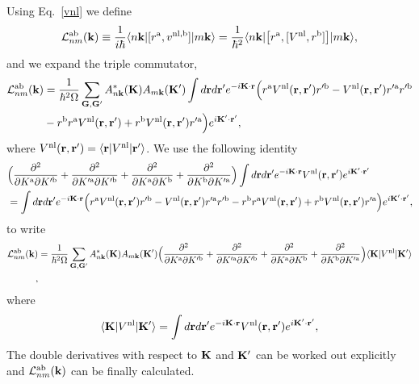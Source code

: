 \documentclass[floatfix,prb,aps,superscriptaddress,11pt,preprint,letterpaper]{revtex4}
\begin{document}
\label{calt}
Using Eq.~\eqref{vnl} we define
\begin{align}\label{3.1}
{\cal L}^{\mathrm{a}\mathrm{b}}_{nm}(\mathbf{k}) 
\equiv\frac{1}{i\hbar}
\langle n\mathbf{k} |
[ r^{\mathrm{a}}, v^{\mathrm{nl},\mathrm{b}}]
| m\mathbf{k} \rangle
=
\frac{1}{\hbar^2}
\langle n\mathbf{k} |
\big[ r^{\mathrm{a}},[ V^{\mathrm{nl}}, r^{\mathrm{b}}]\big]
| m\mathbf{k} \rangle
,
\end{align} 
{\color{red} and we expand the triple commutator,}
\begin{align}\label{3.5}
{\cal L}^{\mathrm{a}\mathrm{b}}_{nm}(\mathbf{k}) 
&=
\frac{1}{\hbar^2\Omega}
\sum_{\mathbf{G},\mathbf{G}'} 
A^*_{n\mathbf{k}}(\mathbf{K}) 
A_{m\mathbf{k}}(\mathbf{K}')
\int
d\mathbf{r} d\mathbf{r}'
 e^{-i\mathbf{K}\cdot\mathbf{r}}
\Big(
r^{\mathrm{a}}
V^{\mathrm{nl}}(\mathbf{r},\mathbf{r}')
r'^{\mathrm{b}}
-
V^{\mathrm{nl}}(\mathbf{r},\mathbf{r}')
r'^{\mathrm{a}}
r'^{\mathrm{b}}
\nonumber\\
&-
r^{\mathrm{b}}
r^{\mathrm{a}}
V^{\mathrm{nl}}(\mathbf{r},\mathbf{r}')
+
 r^{\mathrm{b}}
V^{\mathrm{nl}}(\mathbf{r},\mathbf{r}')
r'^{\mathrm{a}}
\Big) 
 e^{i\mathbf{K}'\cdot\mathbf{r}'}
,
\end{align} 
where 
$V^{\mathrm{nl}}(\mathbf{r},\mathbf{r}') = \langle \mathbf{r} | V^{\mathrm{nl}}| \mathbf{r}' \rangle$.
We use the following identity
\begin{align}\label{3.4}
&
\Big(
\frac{\partial^2}{\partial K^{\mathrm{a}}\partial K'^{\mathrm{b}}}
+
\frac{\partial^2}{\partial K'^{\mathrm{a}}\partial K'^{\mathrm{b}}}
+
\frac{\partial^2}{\partial K^{\mathrm{a}}\partial K^{\mathrm{b}}}
+
\frac{\partial^2}{\partial K^{\mathrm{b}}\partial K'^{\mathrm{a}}}
\Big)
\int 
d\mathbf{r} d\mathbf{r}' 
 e^{-i\mathbf{K}\cdot\mathbf{r}}
V^{\mathrm{nl}}(\mathbf{r},\mathbf{r}') 
e^{i\mathbf{K}'\cdot\mathbf{r}'}
\nonumber\\
&=
\int d\mathbf{r} d\mathbf{r}'
 e^{-i\mathbf{K}\cdot\mathbf{r}}
\Big( 
r^{\mathrm{a}} 
V^{\mathrm{nl}}(\mathbf{r},\mathbf{r}') 
r'^{\mathrm{b}}
- 
V^{\mathrm{nl}}(\mathbf{r},\mathbf{r}') 
r'^{\mathrm{a}} 
r'^{\mathrm{b}}
- 
r^{\mathrm{b}} 
r^{\mathrm{a}} 
V^{\mathrm{nl}}(\mathbf{r},\mathbf{r}')
+
 r^{\mathrm{b}} 
V^{\mathrm{nl}}(\mathbf{r},\mathbf{r}') 
r'^{\mathrm{a}}
\Big)  
e^{i\mathbf{K}'\cdot\mathbf{r}'}
,
\end{align}
to write
\begin{align}\label{3.7}
{\cal L}^{\mathrm{a}\mathrm{b}}_{nm}(\mathbf{k})
&=
\frac{1}{\hbar^2\Omega}
\sum_{\mathbf{G},\mathbf{G}'} 
A^*_{n\mathbf{k}}(\mathbf{K}) 
A_{m\mathbf{k}}(\mathbf{K}')
\Big(
\frac{\partial^2}{\partial K^{\mathrm{a}}\partial K'^{\mathrm{b}}}
+
\frac{\partial^2}{\partial K'^{\mathrm{a}}\partial K'^{\mathrm{b}}}
+
\frac{\partial^2}{\partial K^{\mathrm{a}}\partial K^{\mathrm{b}}}
+
\frac{\partial^2}{\partial K^{\mathrm{b}}\partial K'^{\mathrm{a}}}
\Big)
\langle \mathbf{K} | 
V^{\mathrm{nl}} 
| \mathbf{K}' \rangle 
\nonumber\\
,
\end{align} 
where
\begin{align}\label{vkk}
\langle \mathbf{K} | 
V^{\mathrm{nl}} 
| \mathbf{K}' \rangle 
=
\int 
d\mathbf{r} d\mathbf{r}' 
 e^{-i\mathbf{K}\cdot\mathbf{r}}
V^{\mathrm{nl}}(\mathbf{r},\mathbf{r}') 
e^{i\mathbf{K}'\cdot\mathbf{r}'}
,
\end{align}
The double derivatives with respect to $\mathbf{K}$ and $\mathbf{K}'$ 
can be worked out explicitly {\color{red} and} 
${\cal L}^{\mathrm{a}\mathrm{b}}_{nm}(\mathbf{k})$
{\color{red} can} be finally calculated.\cite{valerie}
\end{document}
